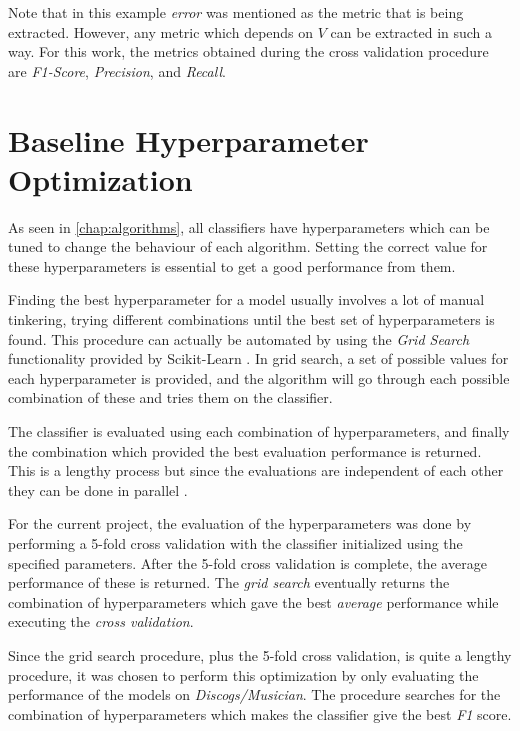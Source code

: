\documentclass[epsfig,a4paper,11pt,titlepage,twoside,openany]{book}
\begin{document}
Note that in this example \textit{error} was mentioned as the metric that is being extracted. However, any metric which depends on $V$ can be extracted in such a way. For this work, the metrics obtained during the cross validation procedure are \textit{F1-Score}, \textit{Precision}, and \textit{Recall}.


\section{Baseline Hyperparameter Optimization}
\label{sec:hyperpar-optimization}

As seen in \autoref{chap:algorithms}, all classifiers have hyperparameters which can be tuned to change the behaviour of each algorithm. Setting the correct value for these hyperparameters is essential to get a good performance from them. 

Finding the best hyperparameter for a model usually involves a lot of manual tinkering, trying different combinations until the best set of hyperparameters is found. This procedure can actually be automated by using the \textit{Grid Search} \cite{claesen2015hyperparameter} functionality provided by Scikit-Learn \cite{scikit-learn}. In grid search, a set of possible values for each hyperparameter is provided, and the algorithm will go through each possible combination of these and tries them on the classifier. 

The classifier is evaluated using each combination of hyperparameters, and finally the combination which provided the best evaluation performance is returned. This is a lengthy process but since the evaluations are independent of each other they can be done in parallel \cite{Bergstra:2012_random_gs}.

For the current project, the evaluation of the hyperparameters was done by performing a 5-fold cross validation with the classifier initialized using the specified parameters. After the 5-fold cross validation is complete, the average performance of these is returned. The \textit{grid search} eventually returns the combination of hyperparameters which gave the best \textit{average} performance while executing the \textit{cross validation}.

Since the grid search procedure, plus the 5-fold cross validation, is quite a lengthy procedure, it was chosen to perform this optimization by only evaluating the performance of the models on \textit{Discogs/Musician}. The procedure searches for the combination of hyperparameters which makes the classifier give the best \textit{F1} score.
\end{document}
